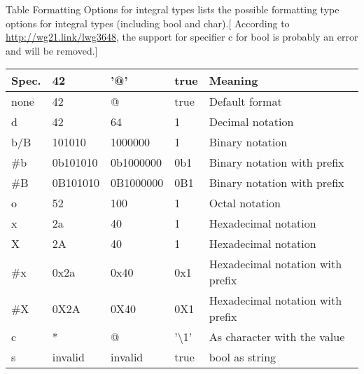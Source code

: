 
Table Formatting Options for integral types lists the possible formatting type options for integral types (including bool and char).[ According to \url{http://wg21.link/lwg3648}, the support for specifier c for bool is probably an error and will be removed.]

\begin{longtable}[c]{|l|l|l|l|l|}
\hline
\textbf{Spec.} & \textbf{42} & \textbf{'@'} & \textbf{true}       & \textbf{Meaning}                 \\ \hline
\endfirsthead
%
\endhead
%
none           & 42          & @            & true                & Default format                   \\ \hline
d              & 42          & 64           & 1                   & Decimal notation                 \\ \hline
b/B            & 101010      & 1000000      & 1                   & Binary notation                  \\ \hline
\#b            & 0b101010    & 0b1000000    & 0b1                 & Binary notation with prefix      \\ \hline
\#B            & 0B101010    & 0B1000000    & 0B1                 & Binary notation with prefix      \\ \hline
o              & 52          & 100          & 1                   & Octal notation                   \\ \hline
x              & 2a          & 40           & 1                   & Hexadecimal notation             \\ \hline
X              & 2A          & 40           & 1                   & Hexadecimal notation             \\ \hline
\#x            & 0x2a        & 0x40         & 0x1                 & Hexadecimal notation with prefix \\ \hline
\#X            & 0X2A        & 0X40         & 0X1                 & Hexadecimal notation with prefix \\ \hline
c              & *           & @            & '\textbackslash{}1' & As character with the value      \\ \hline
s              & invalid     & invalid      & true                & bool as string                   \\ \hline
\end{longtable}

